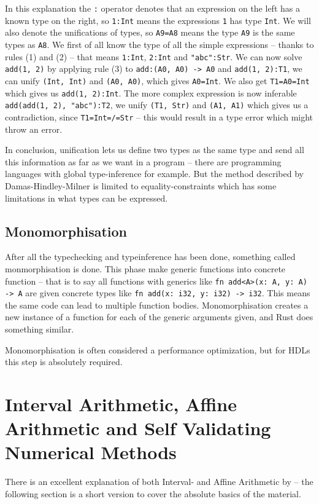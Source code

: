 In this explanation the \verb+:+ operator denotes that an expression on the left has a known type on the right, so \verb+1:Int+ means the expressions \verb+1+ has type \verb+Int+. We will also denote the unifications of types, so \verb+A9=A8+ means the type \verb+A9+ is the same types as \verb+A8+. We first of all know the type of all the simple expressions -- thanks to rules (1) and (2) -- that means \verb+1:Int+, \verb+2:Int+ and \verb+"abc":Str+. We can now solve \verb+add(1, 2)+ by applying rule (3) to \verb+add:(A0, A0) -> A0+ and \verb+add(1, 2):T1+, we can unify \verb+(Int, Int)+ and \verb+(A0, A0)+, which gives \verb+A0=Int+. We also get \verb+T1=A0=Int+ which gives us \verb+add(1, 2):Int+. The more complex expression is now inferable \verb+add(add(1, 2), "abc"):T2+, we unify \verb+(T1, Str)+ and \verb+(A1, A1)+ which gives us a contradiction, since \verb+T1=Int=/=Str+ -- this would result in a type error which might throw an error.

In conclusion, unification lets us define two types as the same type and send all this information as far as we want in a program -- there are programming languages with global type-inference for example. But the method described by Damas-Hindley-Milner is limited to equality-constraints which has some limitations in what types can be expressed.

\subsection{Monomorphisation}
After all the typechecking and typeinference has been done, something called monmorphisation is done. This phase make generic functions into concrete function -- that is to say all functions with generics like \verb+fn add<A>(x: A, y: A) -> A+ are given concrete types like \verb+fn add(x: i32, y: i32) -> i32+. This means the same code can lead to multiple function bodies. Monomorphisation creates a new instance of a function for each of the generic arguments given, and Rust does something similar. \cite{src:rustMono}

Monomorphisation is often considered a performance optimization, but for HDLs this step is absolutely required.

\section{Interval Arithmetic, Affine Arithmetic and Self Validating Numerical Methods}
\label{sec:IAndAA}

There is an excellent explanation of both Interval- and Affine Arithmetic by \citeauthor{src:affAri} -- the following section is a short version to cover the absolute basics of the material.

